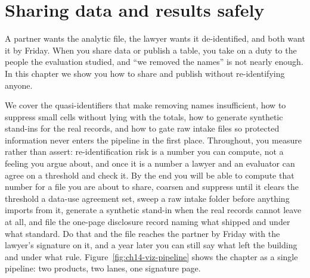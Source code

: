 \documentclass[
    a4paper,
    fontsize=10pt,
    twoside=true,
    numbers=noenddot,
]{kaobook}
\begin{document}
\chapter{Sharing data and results safely}\label{ch:sharing}

A partner wants the analytic file, the lawyer wants it de-identified, and both want it by Friday. When you share data or publish a table, you take on a duty to the people the evaluation studied, and \enquote{we removed the names} is not nearly enough. In this chapter we show you how to share and publish without re-identifying anyone.

We cover the quasi-identifiers that make removing names insufficient, how to suppress small cells without lying with the totals, how to generate synthetic stand-ins for the real records, and how to gate raw intake files so protected information never enters the pipeline in the first place.  Throughout, you measure rather than assert: re-identification risk is a number you can compute, not a feeling you argue about, and once it is a number a lawyer and an evaluator can agree on a threshold and check it. By the end you will be able to compute that number for a file you are about to share, coarsen and suppress until it clears the threshold a data-use agreement set, sweep a raw intake folder before anything imports from it, generate a synthetic stand-in when the real records cannot leave at all, and file the one-page disclosure record naming what shipped and under what standard. Do that and the file reaches the partner by Friday with the lawyer's signature on it, and a year later you can still say what left the building and under what rule. Figure~\ref{fig:ch14-viz-pipeline} shows the chapter as a single pipeline: two products, two lanes, one signature page.
\end{document}
